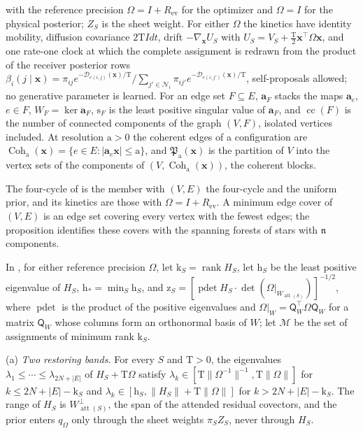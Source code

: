 with the reference precision \(\Omega=I+R_{\mathrm{ev}}\) for the optimizer
and \(\Omega=I\) for the physical posterior; \(Z_S\) is the sheet weight. For
either \(\Omega\) the kinetics have identity mobility, diffusion covariance
\(2\mathrm TI dt\), drift \(-\nabla_{\mathbf x}U_S\) with
\(U_S=V_S+\tfrac{\mathrm T}2\mathbf x^\top\Omega\mathbf x\), and one rate-one
clock at which the complete assignment is redrawn from the product of the
receiver posterior rows
\(\beta_i(j\mid\mathbf x)=\pi_{ij}e^{-\mathcal D_{e(i,j)}(\mathbf x)/\mathrm T}
\big/\allowbreak\sum_{j'\in\mathcal N_i}\pi_{ij'}e^{-\mathcal D_{e(i,j')}(\mathbf x)/\mathrm T}\),
self-proposals allowed; no generative parameter is learned. For an edge set
\(F\subseteq E\), \(\mathbf a_F\) stacks the maps \(\mathbf a_e\), \(e\in F\),
\(W_F=\ker\mathbf a_F\), \(\mathrm s_F\) is the least positive singular value
of \(\mathbf a_F\), and \(\operatorname{cc}(F)\) is the number of connected
components of the graph \((V,F)\), isolated vertices included. At resolution
\(\mathrm a>0\) the coherent edges of a configuration are
\(\operatorname{Coh}_{\mathrm a}(\mathbf x)=\{e\in E:|\mathbf a_e\mathbf x|\le\mathrm a\}\),
and \(\mathfrak P_{\mathrm a}(\mathbf x)\) is the partition of \(V\) into the
vertex sets of the components of \((V,\operatorname{Coh}_{\mathrm a}(\mathbf x))\),
the coherent blocks.

The four-cycle of  is the member with
\((V,E)\) the four-cycle and the uniform prior, and its kinetics are those with
\(\Omega=I+R_{\mathrm{ev}}\). A minimum edge cover of \((V,E)\) is an edge set
covering every vertex with the fewest edges; the proposition identifies these
covers with the spanning forests of stars with \(\mathfrak n\) components.

In , for either reference precision
\(\Omega\), let \(\mathrm k_S=\operatorname{rank}H_S\), let \(\mathrm h_S\) be
the least positive eigenvalue of \(H_S\), \(\mathrm h_*=\min_S\mathrm h_S\),
and \(\mathrm z_S=[\operatorname{pdet}H_S\cdot\det(\Omega|_{W_{\operatorname{att}(S)}})]^{-1/2}\),
where \(\operatorname{pdet}\) is the product of the positive eigenvalues and
\(\Omega|_W=\mathsf Q_W^\top\Omega\mathsf Q_W\) for a matrix \(\mathsf Q_W\)
whose columns form an orthonormal basis of \(W\); let \(\mathcal M\) be the set
of assignments of minimum rank \(\mathrm k_S\).

(a) \emph{Two restoring bands.} For every \(S\) and \(\mathrm T>0\), the
eigenvalues \(\lambda_1\le\cdots\le\lambda_{2N+|E|}\) of \(H_S+\mathrm T\Omega\)
satisfy \(\lambda_k\in[\mathrm T\|\Omega^{-1}\|^{-1},\mathrm T\|\Omega\|]\) for
\(k\le2N+|E|-\mathrm k_S\) and
\(\lambda_k\in[\mathrm h_S,\|H_S\|+\mathrm T\|\Omega\|]\) for
\(k>2N+|E|-\mathrm k_S\). The range of \(H_S\) is
\(W_{\operatorname{att}(S)}^\perp\), the span of the attended residual
covectors, and the prior enters \(q_\Omega\) only through the sheet weights
\(\pi_SZ_S\), never through \(H_S\).

